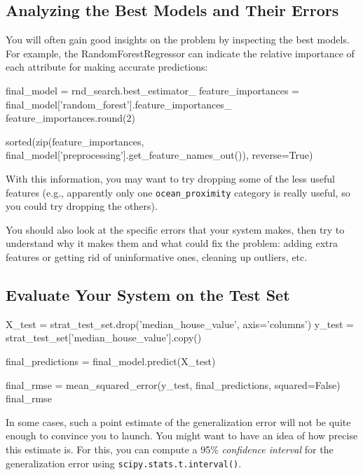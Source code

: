 \subsection{Analyzing the Best Models and Their Errors}
You will often gain good insights on the problem by inspecting the best models. For
example, the RandomForestRegressor can indicate the relative importance of each
attribute for making accurate predictions:
\begin{pyc}
final_model = rnd_search.best_estimator_
feature_importances = final_model['random_forest'].feature_importances_
feature_importances.round(2)

sorted(zip(feature_importances,
           final_model['preprocessing'].get_feature_names_out()),
       reverse=True)
\end{pyc}
With this information, you may want to try dropping some of the less useful features
(e.g., apparently only one \verb|ocean_proximity| category is really useful, so you could try
dropping the others).

You should also look at the specific errors that your system makes, then try to
understand why it makes them and what could fix the problem: adding extra features
or getting rid of uninformative ones, cleaning up outliers, etc.

\subsection{Evaluate Your System on the Test Set}
\begin{pyc}
X_test = strat_test_set.drop('median_house_value', axis='columns')
y_test = strat_test_set['median_house_value'].copy()

final_predictions = final_model.predict(X_test)

final_rmse = mean_squared_error(y_test, final_predictions, squared=False)
final_rmse
\end{pyc}

In some cases, such a point estimate of the generalization error will not be quite enough to convince you to launch. You might want to have an idea of how precise this estimate is. For this, you can compute a 95\% \emph{confidence interval} for the generalization error using \verb|scipy.stats.t.interval()|.

